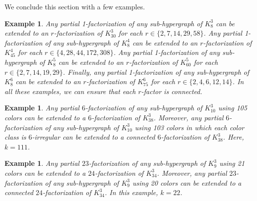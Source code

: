 \documentclass[12pt,oneside]{amsart}
\newtheorem{example}[theorem]{Example}
\begin{document}
We conclude this section with a few examples.
\begin{example} \textup{
Any partial 1-factorization of any  sub-hypergraph of $K_8^3$ can be extended to an $r$-factorization of $K_{30}^3$ for each $r\in \{2,7,14,29,58\}$. Any partial 1-factorization of  any  sub-hypergraph of $K_8^4$ can be extended to an $r$-factorization of $K_{45}^4$ for each $r\in \{4,28,44,172,308\}$. Any partial 1-factorization of any  sub-hypergraph of $K_8^5$ can be extended to an $r$-factorization of $K_{60}^5$ for each $r\in \{2, 7, 14, 19, 29\}$. Finally, any partial 1-factorization of any  sub-hypergraph of $K_8^6$ can be extended to an $r$-factorization of $K_{75}^6$ for each $r\in \{2,4, 6, 12, 14\}$. In all these examples, we can ensure that each $r$-factor is connected.
}\end{example}
\begin{example} \label{examp2}\textup{ 
Any partial $6$-factorization of any sub-hypergraph of $K_{10}^3$ using 105 colors can be extended to a $6$-factorization of $K_{38}^3$.  Moreover, any partial $6$-factorization of any sub-hypergraph of $K_{10}^3$ using 103 colors in which each color class is $6$-irregular can be extended to a connected $6$-factorization of $K_{38}^3$. Here,  $k= 111$.
}\end{example}
\begin{example} \textup{ 
Any partial $23$-factorization of any sub-hypergraph of $K_{9}^3$ using 21 colors can be extended to a $24$-factorization of $K_{34}^3$.  Moreover, any partial $23$-factorization of any sub-hypergraph of $K_{9}^3$ using 20 colors can be extended to a connected $24$-factorization of $K_{34}^3$. In this example,  $k= 22$.
}\end{example}
\end{document}
